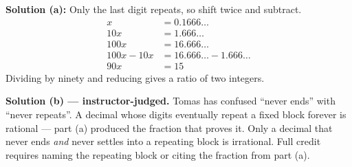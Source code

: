 \documentclass[12pt]{article}
\begin{document}

\textbf{Solution (a):} \quad Only the last digit repeats, so shift twice and subtract.
\begin{align*}
  x &= 0.1666\ldots \\
  10x &= 1.666\ldots \\
  100x &= 16.666\ldots \\
  100x - 10x &= 16.666\ldots - 1.666\ldots \\
  90x &= 15
\end{align*}
Dividing by ninety and reducing gives a ratio of two integers. 

\textbf{Solution (b) --- instructor-judged.} \quad Tomas has confused ``never ends'' with
``never repeats''. A decimal whose digits eventually repeat a fixed block forever is
rational --- part (a) produced the fraction that proves it. Only a decimal that never ends
\emph{and} never settles into a repeating block is irrational. Full credit requires naming
the repeating block or citing the fraction from part (a).
\end{document}
